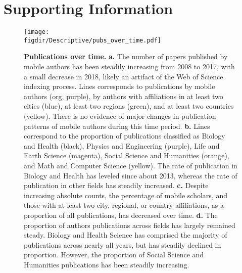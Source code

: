 \documentclass[12pt]{article} %
\def\figdir{../Figs}
\newcommand{\beginsupplement}{%
        \setcounter{table}{0}
        \renewcommand{\thetable}{S\arabic{table}}%
        \setcounter{figure}{0}
        \renewcommand{\thefigure}{S\arabic{figure}}%
     }
\begin{document}
\newpage
\clearpage
\beginsupplement
\section{Supporting Information}



%
%
\begin{figure}[p!]
	\centering
	\texttt{[image: \\figdir/Descriptive/pubs\_over\_time.pdf]}
	\caption{
		\textbf{Publications over time.}
		\textbf{a.}
		The number of papers published by mobile authors has been steadily increasing from 2008 to 2017, with a small decrease in 2018,  likely an artifact of the Web of Science indexing process.
		Lines corresponds to publications by mobile authors (org, purple), by authors with affiliations in at least two cities (blue), at least two regions (green), and at least two countries (yellow).
		There is no evidence of major changes in publication patterns of mobile authors during this time period. 
		\textbf{b.}
		Lines correspond to the proportion of publications classified as Biology and Health (black), Physics and Engineering (purple), Life and Earth Science (magenta), Social Science and Humanities (orange), and Math and Computer Science (yellow).
		The rate of publication in Biology and Health has leveled since about 2013, whereas the rate of publication in other fields has steadily increased. 
		\textbf{c.} 
		Despite increasing absolute counts, the percentage of mobile scholars, and those with at least two city, regional, or country affiliations, as a proportion of all publications, has decreased over time. 
		\textbf{d.} 
		The proportion of authors publications across fields has largely remained steady.
		Biology and Health Science has comprised the majority of publications across nearly all years, but has steadily declined in proportion. 
		However, the proportion of Social Science and Humanities publications has been steadily increasing. 
	}
	\label{fig:supp:pubs_over_time}
\end{figure}
\end{document}
